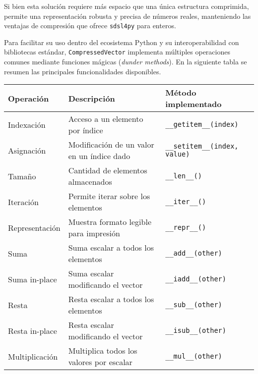\vspace{1em}
\noindent
Si bien esta solución requiere más espacio que una única estructura comprimida, permite una representación robusta y precisa de números reales, manteniendo las ventajas de compresión que ofrece \texttt{sdsl4py} para enteros.

Para facilitar su uso dentro del ecosistema Python y su interoperabilidad con bibliotecas estándar, \texttt{CompressedVector} implementa múltiples operaciones comunes mediante funciones mágicas (\textit{dunder methods}). En la siguiente tabla se resumen las principales funcionalidades disponibles.

\begin{table}[H]
\centering
\renewcommand{\arraystretch}{1.3} %
\begin{tabular}{|p{3.5cm}|p{6cm}|p{5cm}|}
\hline
\textbf{Operación} & \textbf{Descripción} & \textbf{Método implementado} \\
\hline
\rule{0pt}{1.5em}Indexación         & Acceso a un elemento por índice                & \texttt{\_\_getitem\_\_(index)} \\
\hline
\rule{0pt}{1.5em}Asignación         & Modificación de un valor en un índice dado     & \texttt{\_\_setitem\_\_(index, value)} \\
\hline
\rule{0pt}{1.5em}Tamaño             & Cantidad de elementos almacenados              & \texttt{\_\_len\_\_()} \\
\hline
\rule{0pt}{1.5em}Iteración          & Permite iterar sobre los elementos             & \texttt{\_\_iter\_\_()} \\
\hline
\rule{0pt}{1.5em}Representación     & Muestra formato legible para impresión         & \texttt{\_\_repr\_\_()} \\
\hline
\rule{0pt}{1.5em}Suma               & Suma escalar a todos los elementos             & \texttt{\_\_add\_\_(other)} \\
\hline
\rule{0pt}{1.5em}Suma in-place      & Suma escalar modificando el vector             & \texttt{\_\_iadd\_\_(other)} \\
\hline
\rule{0pt}{1.5em}Resta              & Resta escalar a todos los elementos            & \texttt{\_\_sub\_\_(other)} \\
\hline
\rule{0pt}{1.5em}Resta in-place     & Resta escalar modificando el vector            & \texttt{\_\_isub\_\_(other)} \\
\hline
\rule{0pt}{1.5em}Multiplicación     & Multiplica todos los valores por escalar       & \texttt{\_\_mul\_\_(other)} \\

\end{tabular}
\end{table}
